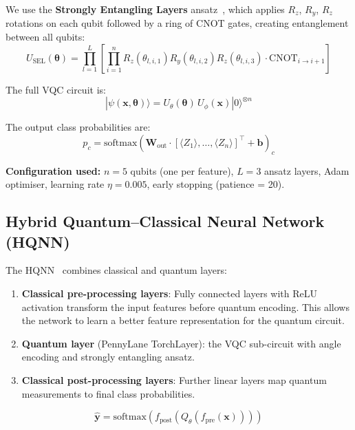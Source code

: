 \documentclass[12pt, a4paper]{article}
\newcommand{\vect}[1]{\boldsymbol{#1}}
\newcommand{\mat}[1]{\mathbf{#1}}
\newcommand{\ket}[1]{|#1\rangle}
\begin{document}
We use the \textbf{Strongly Entangling Layers} ansatz~\cite{pennylane2019},
which applies $R_z$, $R_y$, $R_z$ rotations on each qubit followed by a
ring of CNOT gates, creating entanglement between all qubits:
\begin{equation}
    U_\text{SEL}(\vect{\theta}) = \prod_{l=1}^{L} \left[
        \prod_{i=1}^{n} R_z(\theta_{l,i,1}) R_y(\theta_{l,i,2}) R_z(\theta_{l,i,3})
        \cdot \text{CNOT}_{i \to i+1}
    \right]
\end{equation}

The full VQC circuit is:
\begin{equation}
    \ket{\psi(\vect{x}, \vect{\theta})} = U_\theta(\vect{\theta})\, U_\phi(\vect{x}) \ket{0}^{\otimes n}
\end{equation}

The output class probabilities are:
\begin{equation}
    p_c = \text{softmax}\!\left(\mat{W}_{\text{out}} \cdot [\langle Z_1 \rangle, \dots, \langle Z_n \rangle]^\top + \vect{b}\right)_c
\end{equation}

\textbf{Configuration used:}
$n = 5$ qubits (one per feature), $L = 3$ ansatz layers,
Adam optimiser, learning rate $\eta = 0.005$, early stopping (patience = 20).

\subsection{Hybrid Quantum--Classical Neural Network (HQNN)}
\label{sec:hqnn}

The HQNN~\cite{mari2020transfer} combines classical and quantum layers:
\begin{enumerate}
    \item \textbf{Classical pre-processing layers}: Fully connected layers
          with ReLU activation transform the input features before quantum encoding.
          This allows the network to learn a better feature representation
          for the quantum circuit.
    \item \textbf{Quantum layer} (PennyLane TorchLayer): the VQC sub-circuit
          with angle encoding and strongly entangling ansatz.
    \item \textbf{Classical post-processing layers}: Further linear layers map
          quantum measurements to final class probabilities.
\end{enumerate}

\begin{equation}
    \hat{\vect{y}} = \text{softmax}\!\left(
        f_{\text{post}}\!\left(
            Q_\theta\!\left(f_{\text{pre}}(\vect{x})\right)
        \right)
    \right)
\end{equation}
\end{document}

